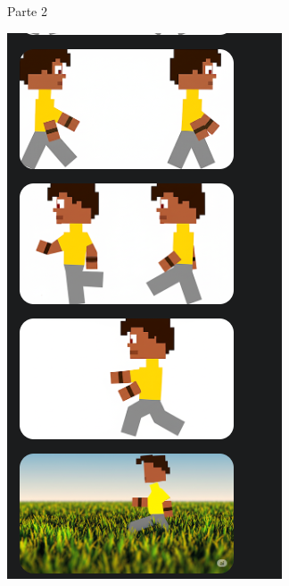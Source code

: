 \begin{figure}[htbp]
\begin{subfigure}{0.45\linewidth}
        \caption{\small Parte 2}
        \label{fig:geminiProSheet5_1b}
    \end{subfigure}\hfill
    \begin{subfigure}{0.3\linewidth}
        \includegraphics[width=1\linewidth]{figs/geminiPro/chat10/tela1_res1_3.PNG}

\end{subfigure}
\end{figure}
